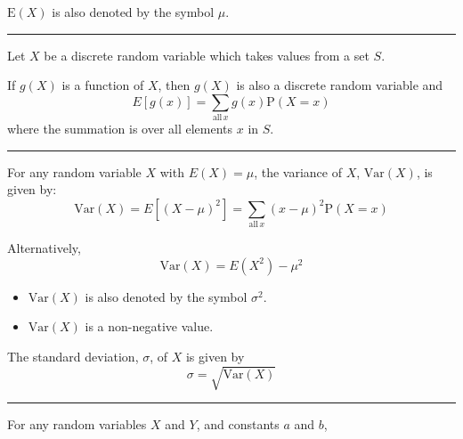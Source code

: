 \documentclass[11pt,a4paper]{book}
\begin{document}
$\text{E}\left(X\right)$ is also denoted by the symbol $\mu$.

\vspace{5pt}
\hrule
\vspace{6pt}

Let $X$ be a discrete random variable which takes values from a set
$S$.

If $g\left(X\right)$ is a function of $X$, then $g\left(X\right)$
is also a discrete random variable and 
\[
E\left[g\left(x\right)\right]=\sum_{\text{all}\,x}g\left(x\right)\text{P}\left(X=x\right)
\]
where the summation is over all elements $x$ in $S$.

\vspace{5pt}
\hrule
\vspace{6pt}

For any random variable $X$ with $E\left(X\right)=\mu$, the variance
of $X$, $\text{Var}\left(X\right)$, is given by:
\[
\text{Var}\left(X\right)=E\left[\left(X-\mu\right)^{2}\right]=\sum_{\text{all}\,x}\left(x-\mu\right)^{2}\text{P}\left(X=x\right)
\]

Alternatively, 
\[
\text{Var}\left(X\right)=E\left(X^{2}\right)-\mu^{2}
\]

\begin{itemize}
\item $\text{Var}\left(X\right)$ is also denoted by the symbol $\sigma^{2}$. 
\item $\text{Var}\left(X\right)$ is a non-negative value.
\end{itemize}
The standard deviation, $\sigma$, of $X$ is given by 
\[
\sigma=\sqrt{\text{Var}\left(X\right)}
\]

\vspace{5pt}
\hrule
\vspace{6pt}

For any random variables $X$ and $Y$, and constants $a$ and $b$,

\medskip{}
\end{document}
